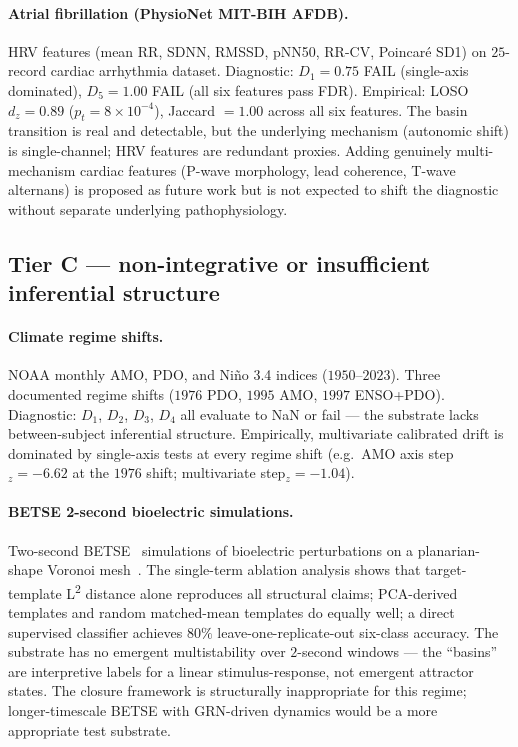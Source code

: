 \documentclass[11pt,a4paper]{article}
\begin{document}
\paragraph{Atrial fibrillation (PhysioNet MIT-BIH AFDB).}
HRV features (mean RR, SDNN, RMSSD, pNN50, RR-CV, Poincar\'e SD1) on $25$-record cardiac arrhythmia dataset. Diagnostic: $D_1 = 0.75$ FAIL (single-axis dominated), $D_5 = 1.00$ FAIL (all six features pass FDR). Empirical: LOSO $d_z = 0.89$ ($p_t = 8 \times 10^{-4}$), Jaccard $= 1.00$ across all six features. The basin transition is real and detectable, but the underlying mechanism (autonomic shift) is single-channel; HRV features are redundant proxies. Adding genuinely multi-mechanism cardiac features (P-wave morphology, lead coherence, T-wave alternans) is proposed as future work but is not expected to shift the diagnostic without separate underlying pathophysiology.

\subsection{Tier C --- non-integrative or insufficient inferential structure}\label{sec:results-tier-c}

\paragraph{Climate regime shifts.}
NOAA monthly AMO, PDO, and Ni\~no 3.4 indices ($1950$--$2023$). Three documented regime shifts ($1976$ PDO, $1995$ AMO, $1997$ ENSO+PDO). Diagnostic: $D_1$, $D_2$, $D_3$, $D_4$ all evaluate to NaN or fail --- the substrate lacks between-subject inferential structure. Empirically, multivariate calibrated drift is dominated by single-axis tests at every regime shift (e.g.\ AMO axis step$_z = -6.62$ at the $1976$ shift; multivariate step$_z = -1.04$).

\paragraph{BETSE 2-second bioelectric simulations.}
Two-second BETSE~\citep{pietak2016exploring} simulations of bioelectric perturbations on a planarian-shape Voronoi mesh~\citep{SolutionLab001}. The single-term ablation analysis shows that target-template L\textsuperscript{2} distance alone reproduces all structural claims; PCA-derived templates and random matched-mean templates do equally well; a direct supervised classifier achieves $80\%$ leave-one-replicate-out six-class accuracy. The substrate has no emergent multistability over $2$-second windows --- the ``basins'' are interpretive labels for a linear stimulus-response, not emergent attractor states. The closure framework is structurally inappropriate for this regime; longer-timescale BETSE with GRN-driven dynamics would be a more appropriate test substrate.
\end{document}
